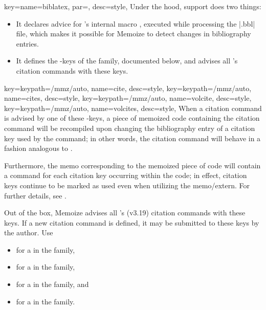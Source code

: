 \documentclass[a4paper,11pt]{article}
\begin{document}
\begin{doc}{
    key={name=biblatex, par=, desc=style},
  }
  Under the hood,  support does two things:
  \begin{itemize}
  \item It declares advice for 's internal macro
    , executed while processing the |.bbl| file, which makes
    it possible for Memoize to detect changes in bibliography entries.
  \item It defines the -keys of the  family,
    documented below, and advises all 's citation commands with
    these keys.
  \end{itemize}
\end{doc}


\begin{doc}{
    key={keypath=/mmz/auto, name=cite, desc=style},
    key={keypath=/mmz/auto, name=cites, desc=style},
    key={keypath=/mmz/auto, name=volcite, desc=style},
    key={keypath=/mmz/auto, name=volcites, desc=style},
  }
  When a citation command is advised by one of these -keys, a
  piece of memoized code containing the citation command will be recompiled
  upon changing the bibliography entry of a citation key used by the command;
  in other words, the citation command will behave in a fashion analogous to
  .
  
  Furthermore, the memo corresponding to the memoized piece of code will
  contain a  command for each citation key occurring within the
  code; in effect, citation keys continue to be marked as used even when
  utilizing the memo\slash extern.  For further details, see .

  Out of the box, Memoize advises all 's (v3.19) citation
  commands with these keys.  If a new citation command is defined, it may be
  submitted to these keys by the author.  Use
  \begin{itemize}
  \item {}
    for a  in the  family,
  \item {}
    for a  in the  family,
  \item {}
    for a  in the  family, and
  \item {}
    for a  in the  family.
  \end{itemize}
  

\end{doc}
\end{document}
